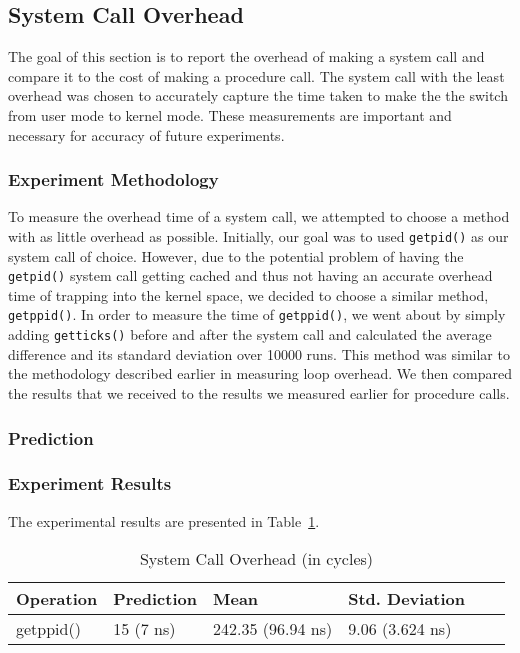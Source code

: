 \documentclass{article} %
\begin{document}
\subsection{System Call Overhead}
The goal of this section is to report the overhead of making a system call and
compare it to the cost of making a procedure call. The system call with the
least overhead was chosen to accurately capture the time taken to make the the
switch from user mode to kernel mode. These measurements are important and
necessary for accuracy of future experiments.

\subsubsection{Experiment Methodology}
To measure the overhead time of a system call, we attempted to choose a method
with as little overhead as possible. Initially, our goal was to used
\texttt{getpid()} as our system call of choice. However, due to the potential
problem of having the \texttt{getpid()} system call getting cached and thus
not having an accurate overhead time of trapping into the kernel space, we
decided to choose a similar method, \texttt{getppid()}. In order to measure
the time of \texttt{getppid()}, we went about by simply adding
\texttt{getticks()} before and after the system call and calculated the
average difference and its standard deviation over 10000 runs. This method was
similar to the methodology described earlier in measuring loop overhead. We
then compared the results that we received to the results we measured earlier
for procedure calls.

\subsubsection{Prediction}

\subsubsection{Experiment Results}
The experimental results are presented in Table~\ref{table:systemcall_overhead}.
\begin{table}
  \begin{center}
    \caption{System Call Overhead (in cycles)}
    \begin{tabular}{|l|l|l|l|l|l|}
      \hline
      Operation   & Prediction            & Mean                       & Std. Deviation     \\ \hline
      getppid()   & 15 (7 ns)             & 242.35 (96.94 ns)          & 9.06 (3.624 ns)    \\ \hline
    \end{tabular}
  \end{center}
  \label{table:systemcall_overhead}
\end{table}
\end{document}
